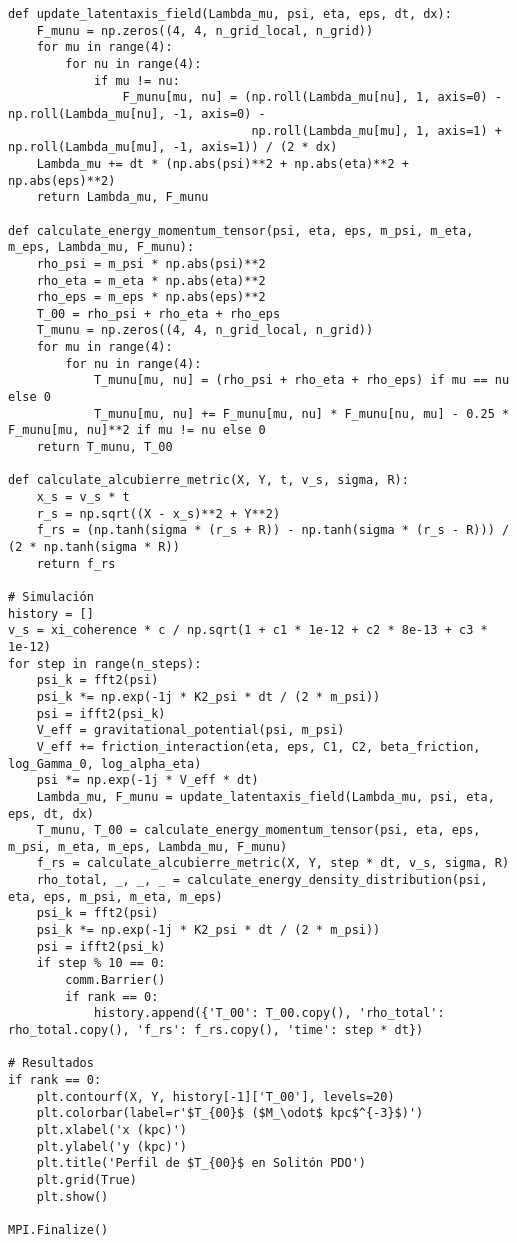 \documentclass[a4paper,12pt]{article}
\begin{document}
\begin{verbatim}
def update_latentaxis_field(Lambda_mu, psi, eta, eps, dt, dx):
    F_munu = np.zeros((4, 4, n_grid_local, n_grid))
    for mu in range(4):
        for nu in range(4):
            if mu != nu:
                F_munu[mu, nu] = (np.roll(Lambda_mu[nu], 1, axis=0) - np.roll(Lambda_mu[nu], -1, axis=0) -
                                  np.roll(Lambda_mu[mu], 1, axis=1) + np.roll(Lambda_mu[mu], -1, axis=1)) / (2 * dx)
    Lambda_mu += dt * (np.abs(psi)**2 + np.abs(eta)**2 + np.abs(eps)**2)
    return Lambda_mu, F_munu

def calculate_energy_momentum_tensor(psi, eta, eps, m_psi, m_eta, m_eps, Lambda_mu, F_munu):
    rho_psi = m_psi * np.abs(psi)**2
    rho_eta = m_eta * np.abs(eta)**2
    rho_eps = m_eps * np.abs(eps)**2
    T_00 = rho_psi + rho_eta + rho_eps
    T_munu = np.zeros((4, 4, n_grid_local, n_grid))
    for mu in range(4):
        for nu in range(4):
            T_munu[mu, nu] = (rho_psi + rho_eta + rho_eps) if mu == nu else 0
            T_munu[mu, nu] += F_munu[mu, nu] * F_munu[nu, mu] - 0.25 * F_munu[mu, nu]**2 if mu != nu else 0
    return T_munu, T_00

def calculate_alcubierre_metric(X, Y, t, v_s, sigma, R):
    x_s = v_s * t
    r_s = np.sqrt((X - x_s)**2 + Y**2)
    f_rs = (np.tanh(sigma * (r_s + R)) - np.tanh(sigma * (r_s - R))) / (2 * np.tanh(sigma * R))
    return f_rs

# Simulación
history = []
v_s = xi_coherence * c / np.sqrt(1 + c1 * 1e-12 + c2 * 8e-13 + c3 * 1e-12)
for step in range(n_steps):
    psi_k = fft2(psi)
    psi_k *= np.exp(-1j * K2_psi * dt / (2 * m_psi))
    psi = ifft2(psi_k)
    V_eff = gravitational_potential(psi, m_psi)
    V_eff += friction_interaction(eta, eps, C1, C2, beta_friction, log_Gamma_0, log_alpha_eta)
    psi *= np.exp(-1j * V_eff * dt)
    Lambda_mu, F_munu = update_latentaxis_field(Lambda_mu, psi, eta, eps, dt, dx)
    T_munu, T_00 = calculate_energy_momentum_tensor(psi, eta, eps, m_psi, m_eta, m_eps, Lambda_mu, F_munu)
    f_rs = calculate_alcubierre_metric(X, Y, step * dt, v_s, sigma, R)
    rho_total, _, _, _ = calculate_energy_density_distribution(psi, eta, eps, m_psi, m_eta, m_eps)
    psi_k = fft2(psi)
    psi_k *= np.exp(-1j * K2_psi * dt / (2 * m_psi))
    psi = ifft2(psi_k)
    if step % 10 == 0:
        comm.Barrier()
        if rank == 0:
            history.append({'T_00': T_00.copy(), 'rho_total': rho_total.copy(), 'f_rs': f_rs.copy(), 'time': step * dt})

# Resultados
if rank == 0:
    plt.contourf(X, Y, history[-1]['T_00'], levels=20)
    plt.colorbar(label=r'$T_{00}$ ($M_\odot$ kpc$^{-3}$)')
    plt.xlabel('x (kpc)')
    plt.ylabel('y (kpc)')
    plt.title('Perfil de $T_{00}$ en Solitón PDO')
    plt.grid(True)
    plt.show()

MPI.Finalize()
\end{verbatim}
\end{document}

